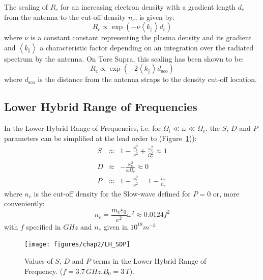 The scaling of $R_c$ for an increasing electron density with a gradient length $d_c$ from the antenna to the cut-off density $n_c$,  is given by:
\begin{equation}
	R_c \propto \exp\left(- \nu \left< k_\parallel \right> d_c \right)
\end{equation}
where $\nu$ is a constant constant representing the plasma density and its gradient and $\left< k_\parallel \right>$ a characteristic factor depending on an integration over the radiated spectrum by the antenna.  On Tore Supra, this scaling has been shown to be:
\begin{equation}
R_c \propto \exp\left(- 2 \left< k_\parallel \right> d_{\mathrm{sco}} \right)
\end{equation}
where $d_{\mathrm{sco}}$ is the distance from the antenna straps to the density cut-off location. 







\subsection{Lower Hybrid Range of Frequencies}\label{sec:lhcd}
In the Lower Hybrid Range of Frequencies, i.e. for $\Omega_i \ll \omega \ll \Omega_e$, the $S$, $D$ and $P$ parameters can be simplified at the lead order \cite[p.222]{Brambilla1998} to (Figure~\ref{fig:lhsdp})):
\begin{subequations}
	\begin{eqnarray}
		S &\approx& 1 - \frac{\omega_i^2}{\omega^2} + \frac{\omega_e^2}{\Omega_e^2} \approx 1 \\
		D &\approx& - \frac{\omega_e^2}{\omega \Omega_e} \approx 0 \\
		P &\approx& 1 - \frac{\omega_e^2}{\omega^2} = 1 - \frac{n_e}{n_c}
	\end{eqnarray}
\end{subequations}
where $n_c$ is the cut-off density for the Slow-wave defined for $P=0$ or, more conveniently:
\begin{equation}
	n_c = \frac{m_e \varepsilon_{0}}{e^2} \omega^2 \approx  0.0124 f^2
	\label{eq:lh_cutoff_density}
\end{equation}
with $f$ specified in $\si{GHz}$ and $n_c$ given in $10^{18}\si{m^{-3}}$ 
\begin{figure}[h]
	\centering
	\texttt{[image: figures/chap2/LH\_SDP]}
	\caption{Values of $S$, $D$ and $P$ terms in the Lower Hybrid Range of Frequency. ($f=3.7\,\si{GHz}$,$B_0=3\,\si{T}$).}
	\label{fig:lhsdp}
\end{figure}


